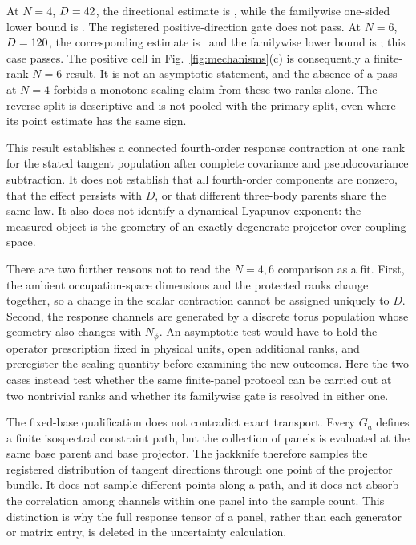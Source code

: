 At $N=4$, $D=42$, the directional estimate is
\MooreReadNFourFullRFourDirectionalEstimate, while the familywise one-sided
lower bound is \MooreReadNFourFullRFourFamilywiseLower.  The registered
positive-direction gate does not pass.  At $N=6$,
$D=120$, the corresponding estimate is
\MooreReadNSixFullRFourDirectionalEstimate\ and the familywise lower bound is
\MooreReadNSixFullRFourFamilywiseLower; this case passes.  The positive cell
in Fig.~\ref{fig:mechanisms}(c) is consequently a finite-rank $N=6$ result.
It is not an asymptotic statement, and the absence of a pass at $N=4$ forbids
a monotone scaling claim from these two ranks alone.  The reverse split is
descriptive and is not pooled with the primary split, even where its point
estimate has the same sign.

This result establishes a connected fourth-order response contraction at
one rank for the stated tangent population after complete covariance and
pseudocovariance subtraction.  It does not establish that all fourth-order
components are nonzero, that the effect persists with $D$, or that different
three-body parents share the same law.  It also does not identify a dynamical
Lyapunov exponent: the measured object is the geometry of an exactly
degenerate projector over coupling space.

There are two further reasons not to read the $N=4,6$ comparison as a fit.
First, the ambient occupation-space dimensions and the protected ranks change
together, so a change in the scalar contraction cannot be assigned uniquely
to $D$.  Second, the response channels are generated by a discrete torus
population whose geometry also changes with $N_\phi$.  An asymptotic test
would have to hold the operator prescription fixed in physical units, open
additional ranks, and preregister the scaling quantity before examining the
new outcomes.  Here the two cases instead test whether the same finite-panel
protocol can be carried out at two nontrivial ranks and whether its familywise
gate is resolved in either one.

The fixed-base qualification does not contradict exact transport.  Every
$G_a$ defines a finite isospectral constraint path, but the collection of
panels is evaluated at the same base parent and base projector.  The
jackknife therefore samples the registered distribution of tangent
directions through one point of the projector bundle.  It does not sample
different points along a path, and it does not absorb the correlation among
channels within one panel into the sample count.  This distinction is why
the full response tensor of a panel, rather than each generator or matrix
entry, is deleted in the uncertainty calculation.

